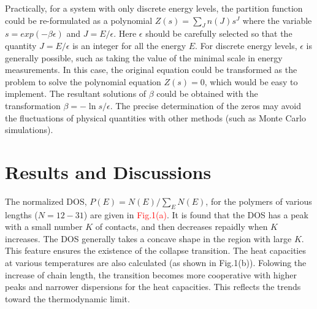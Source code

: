 \documentclass[preprint,preprintnumbers,amsmath,amssymb,showpacs,aps,pre]{revtex4-1}
\begin{document}
Practically, for a system with only discrete energy levels, the partition
function could be
re-formulated as a polynomial $Z(s)=\sum_J n(J) s^J$ where the variable
$s=exp(-\beta\epsilon)$ and $J=E/\epsilon$. Here $\epsilon$ should be carefully
selected so that the quantity $J=E/\epsilon$ is an integer for all the energy
$E$. For discrete energy levels, $\epsilon$ is generally possible, such as
taking the value of the minimal scale in energy measurements. In this case, the
original equation could be transformed as the problem to solve the polynomial
equation $Z(s)=0$, which would be easy to implement. The resultant solutions
of $\beta$ could be obtained with the transformation $\beta=-\ln s/\epsilon$.
The precise determination of the zeros may avoid the fluctuations of physical
quantities with other methods (such as Monte Carlo simulations).

\section{Results and Discussions}

The normalized DOS, $P(E)=N(E)/\sum_E N(E)$, for the polymers of various
lengths ($N=12-31$) are given in \textcolor{red}{Fig.1(a)}. 
It is found that the DOS has a peak with a small number $K$ of
contacts, and then decreases repaidly when $K$ increases. The DOS generally
takes a concave shape in the region with large $K$. This feature ensures the
existence of the collapse transition. The heat capacities at various
temperatures are also calculated (as shown in Fig.1(b)). Folowing the increase
of chain length, the transition becomes more cooperative with higher peaks and
narrower dispersions for the heat capacities. This reflects the trends toward
the thermodynamic limit.
\end{document}
